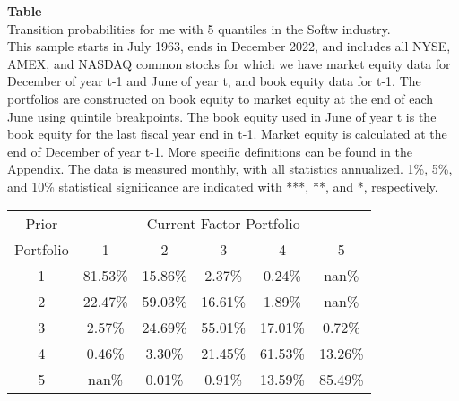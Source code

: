 \begin{table*}[ht!]
\raggedright
{}
\label{tab: transition_probs_me_Softw_with_5_quantiles}
\textbf{Table \thetable} \\
Transition probabilities for me with 5 quantiles in the Softw industry. \\
\hspace*{1em}This sample starts in July 1963, ends in December 2022, and includes all NYSE, AMEX, and NASDAQ common stocks for which we have market equity data for December of year t-1 and June of year t, and book equity data for t-1. The portfolios are constructed on book equity to market equity at the end of each June using quintile breakpoints.  The book equity used in June of year t is the book equity for the last fiscal year end in t-1.  Market equity is calculated at the end of December of year t-1.  More specific definitions can be found in the Appendix.  The data is measured monthly, with all statistics annualized.  1\%, 5\%, and 10\% statistical significance are indicated with ***, **, and *, respectively. \\
\vspace{0.5em}
\centering
\begin{adjustbox}{max width=\textwidth}
\begin{tabular}{@{}cccccc@{}}
\toprule
Prior & \multicolumn{5}{c}{Current Factor Portfolio} \\
Portfolio & 1 & 2 & 3 & 4 & 5 \\
\midrule
1 & 81.53\% & 15.86\% & 2.37\% & 0.24\% & nan\% \\
2 & 22.47\% & 59.03\% & 16.61\% & 1.89\% & nan\% \\
3 & 2.57\% & 24.69\% & 55.01\% & 17.01\% & 0.72\% \\
4 & 0.46\% & 3.30\% & 21.45\% & 61.53\% & 13.26\% \\
5 & nan\% & 0.01\% & 0.91\% & 13.59\% & 85.49\% \\
\bottomrule
\end{tabular}
\end{adjustbox}
\end{table*}